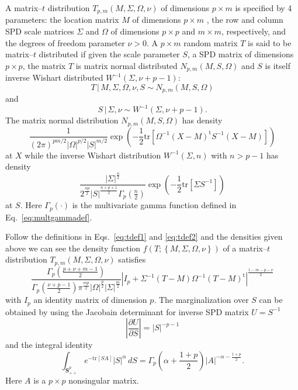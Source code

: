 \documentclass[english,listof=totoc]{scrartcl}
\begin{document}
A matrix--$t$ distribution $T_{p,m}(M,\Sigma,\Omega,\nu)$ of dimensions $p\times m$ is specified by 4 parameters: the location matrix $M$ of dimensions $p\times m$ , the row and column SPD scale matrices $\Sigma$ and $\Omega$ of dimensions $p\times p$ and $m\times m$, respectively, and the degrees of freedom parameter $\nu>0$. A $p \times m$ random matrix $T$ is said to be matrix--$t$ distributed if given the scale parameter $S$, a SPD matrix of dimensions $p\times p$, the matrix $T$ is matrix normal distributed $N_{p,m}(M,S,\Omega)$ and $S$ is itself inverse Wishart distributed $W^{-1}(\Sigma,\nu +p -1)$:
\begin{equation}
T\,|\,M,\Sigma,\Omega,\nu,S \sim N_{p,m}(M,S,\Omega)\label{eq:tdef1}
\end{equation}
and
\begin{equation}
S\,|\,\Sigma,\nu \sim W^{-1}(\Sigma,\nu+p-1).\label{eq:tdef2}
\end{equation}
The matrix normal distribution $N_{p,m}(M,S,\Omega)$ has density
\begin{equation}
\frac{1}{(2\pi)^{pm/2}|\Omega|^{p/2}|S|^{m/2}}\exp\left(-\frac{1}{2}\textrm{tr}\left[\Omega^{-1}(X-M)^{\textrm{t}}S^{-1}(X-M)\right]\right)\label{eq:ndistpdf}
\end{equation}
at $X$ while the inverse Wishart distribution $W^{-1}(\Sigma,n)$ with $n>p-1$ has density
\begin{equation}
\frac{|\Sigma|^{\frac{n}{2}}}{2^{\frac{n p}{2}}|S|^{\frac{n+p+1}{2}}\Gamma_{p}(\frac{n}{2})}\exp\left(-\frac{1}{2}\textrm{tr}\left[\Sigma S^{-1}\right]\right)\label{eq:wdistpdf}
\end{equation}
at $S$. Here $\Gamma_{p}(\cdot)$ is the
multivariate gamma function defined in Eq.~\eqref{eq:multgammadef}.

Follow the definitions in Eqs.~\eqref{eq:tdef1} and \eqref{eq:tdef2} and the densities given above we can see the density function $f(T;\left\{M,\Sigma,\Omega,\nu\right\})$ of a matrix--$t$ distribution $T_{p,m}(M,\Sigma,\Omega,\nu)$ satisfies
\begin{equation}
\frac{\Gamma_{p}\left(\frac{p+\nu+m-1}{2}\right)}{\Gamma_{p}\left(\frac{\nu+p-1}{2}\right)\pi^{\frac{mp}{2}}|\Omega|^{\frac{p}{2}}|\Sigma|^{\frac{m}{2}}}
|I_p+\Sigma^{-1}(T-M)\Omega^{-1}(T-M)^{\textrm{t}}|^{\frac{1-m-p-\nu}{2}}
\label{eq:matrixtpdf}
\end{equation}
with $I_p$ an identity matrix of dimension $p$. The marginalization over $S$ can be obtained by using the Jacobain determinant for inverse SPD matrix $U=S^{-1}$
\begin{equation}
\left|\frac{\partial U}{\partial S}\right|=|S|^{-p-1}
\end{equation}
and the integral identity \citep{gupta1999matrix}
\begin{equation}
\int_{\mathbf{S}_{++}^p}e^{-\textrm{tr}[S A]}|S|^{\alpha}\,dS=\Gamma_{p}\left(\alpha+\frac{1+p}{2}\right)|A|^{-\alpha-\frac{1+p}{2}}.\label{eq:intmultgammadef}
\end{equation}
Here $A$ is a $p\times p$ nonsingular matrix.
\end{document}
